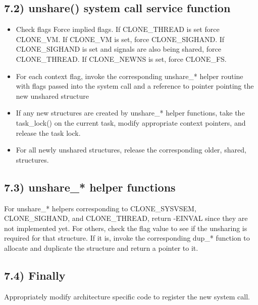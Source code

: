 \documentclass[a4paper,8pt,english]{sphinxmanual}
\begin{document}
\subsection{7.2) unshare() system call service function}
\label{userspace-api/unshare:unshare-system-call-service-function}\begin{itemize}
\item {} 
Check flags
Force implied flags. If CLONE\_THREAD is set force CLONE\_VM.
If CLONE\_VM is set, force CLONE\_SIGHAND. If CLONE\_SIGHAND is
set and signals are also being shared, force CLONE\_THREAD. If
CLONE\_NEWNS is set, force CLONE\_FS.

\item {} 
For each context flag, invoke the corresponding unshare\_*
helper routine with flags passed into the system call and a
reference to pointer pointing the new unshared structure

\item {} 
If any new structures are created by unshare\_* helper
functions, take the task\_lock() on the current task,
modify appropriate context pointers, and release the
task lock.

\item {} 
For all newly unshared structures, release the corresponding
older, shared, structures.

\end{itemize}


\subsection{7.3) unshare\_* helper functions}
\label{userspace-api/unshare:unshare-helper-functions}
For unshare\_* helpers corresponding to CLONE\_SYSVSEM, CLONE\_SIGHAND,
and CLONE\_THREAD, return -EINVAL since they are not implemented yet.
For others, check the flag value to see if the unsharing is
required for that structure. If it is, invoke the corresponding
dup\_* function to allocate and duplicate the structure and return
a pointer to it.


\subsection{7.4) Finally}
\label{userspace-api/unshare:finally}
Appropriately modify architecture specific code to register the
new system call.
\end{document}
